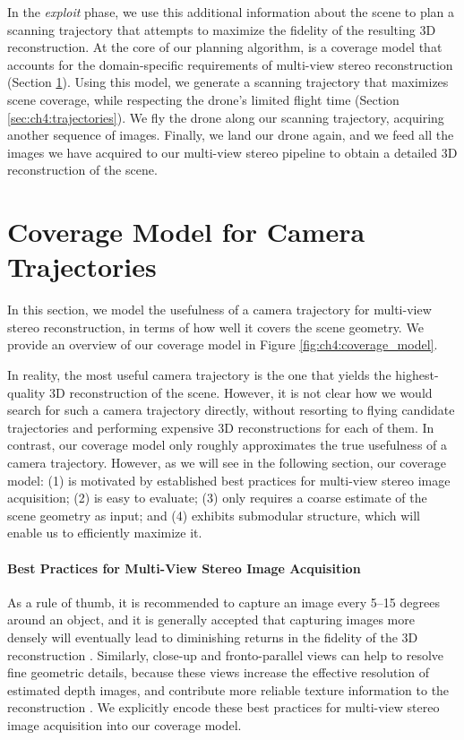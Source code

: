 In the \emph{exploit} phase, we use this additional information about the scene to plan a scanning trajectory that attempts to maximize the fidelity of the resulting 3D reconstruction.
At the core of our planning algorithm, is a coverage model that accounts for the domain-specific requirements of multi-view stereo reconstruction (Section \ref{sec:ch4:coverage_model}).
Using this model, we generate a scanning trajectory that maximizes scene coverage, while respecting the drone's limited flight time (Section \ref{sec:ch4:trajectories}). 
We fly the drone along our scanning trajectory, acquiring another sequence of images.
Finally, we land our drone again, and we feed all the images we have acquired to our multi-view stereo pipeline to obtain a detailed 3D reconstruction of the scene.

\section{Coverage Model for Camera Trajectories}
\label{sec:ch4:coverage_model}

In this section, we model the usefulness of a camera trajectory for multi-view stereo reconstruction, in terms of how well it covers the scene geometry.
We provide an overview of our coverage model in Figure \ref{fig:ch4:coverage_model}.

In reality, the most useful camera trajectory is the one that yields the highest-quality 3D reconstruction of the scene.
However, it is not clear how we would search for such a camera trajectory directly, without resorting to flying candidate trajectories and performing expensive 3D reconstructions for each of them.
In contrast, our coverage model only roughly approximates the true usefulness of a camera trajectory. 
However, as we will see in the following section, our coverage model: (1) is motivated by established best practices for multi-view stereo image acquisition; (2) is easy to evaluate; (3) only requires a coarse estimate of the scene geometry as input;  and (4) exhibits submodular structure, which will enable us to efficiently maximize it.

\paragraph{Best Practices for Multi-View Stereo Image Acquisition}
As a rule of thumb, it is recommended to capture an image every 5--15 degrees around an object, and it is generally accepted that capturing images more densely will eventually lead to diminishing returns in the fidelity of the 3D reconstruction \cite{furukawa:2015}.
Similarly, close-up and fronto-parallel views can help to resolve fine geometric details, because these views increase the effective resolution of estimated depth images, and contribute more reliable texture information to the reconstruction \cite{waechter:2014}.
We explicitly encode these best practices for multi-view stereo image acquisition into our coverage model.

